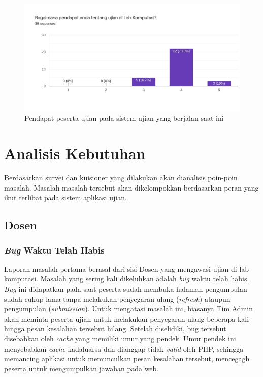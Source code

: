     \begin{figure}
        \centering
        \includegraphics[width=0.7\paperwidth]{Gambar/survey-student-2.pdf}
        \caption{Pendapat peserta ujian pada sistem ujian yang berjalan saat ini}
        \label{fig:kuisioner-student-2}
    \end{figure}
    
\section{Analisis Kebutuhan}
    Berdasarkan survei dan kuisioner yang dilakukan akan dianalisis poin-poin
    masalah. Masalah-masalah tersebut akan dikelompokkan berdasarkan peran yang
    ikut terlibat pada sistem aplikasi ujian.
    
\subsection{Dosen}
    \subsubsection{\textit{Bug} Waktu Telah
        Habis}\label{ref-prob-dosen-bug-waktu} Laporan masalah pertama berasal
        dari sisi Dosen yang mengawasi ujian di lab komputasi. Masalah yang
        sering kali dikeluhkan adalah \textit{bug} waktu telah habis.
        \textit{Bug} ini didapatkan pada saat peserta sudah membuka halaman
        pengumpulan sudah cukup lama tanpa melakukan penyegaran-ulang
        (\textit{refresh}) ataupun pengumpulan (\textit{submission}). Untuk
        mengatasi masalah ini, biasanya Tim Admin akan meminta peserta ujian
        untuk melakukan penyegaran-ulang beberapa kali hingga pesan kesalahan
        tersebut hilang. Setelah diselidiki, bug tersebut disebabkan oleh
        \textit{cache} yang memiliki umur yang pendek. Umur pendek ini
        menyebabkan \textit{cache} kadaluarsa dan dianggap tidak \textit{valid}
        oleh PHP, sehingga memancing aplikasi untuk memunculkan pesan kesalahan
        tersebut, mencegagh peserta untuk mengumpulkan jawaban pada web.
    
